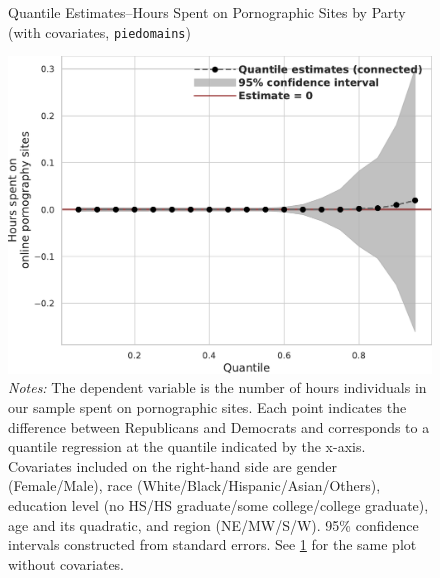 \documentclass[12pt, letterpaper]{article}
\begin{document}
\begin{figure}[ht]
	\centering
	\caption{Quantile Estimates--Hours Spent on Pornographic Sites by Party (with covariates, \texttt{piedomains})}
	\includegraphics[width=.55\linewidth]{figs/quantile_reg_covariates_duration_adult.pdf}
	\caption*{\footnotesize \emph{Notes:} 
		The dependent variable is the number of hours individuals in our sample spent on pornographic sites.
		Each point indicates the difference between Republicans and Democrats and corresponds to a quantile regression at the quantile indicated by the x-axis.
		Covariates included on the right-hand side are gender (Female/Male), race (White/Black/Hispanic/Asian/Others), education level (no HS/HS graduate/some college/college graduate), age and its quadratic, and region (NE/MW/S/W).
		95\% confidence intervals constructed from standard errors.
		See \cref{fig:piedomains_quantile_regression_duration_covariates} for the same plot without covariates.
	}
	\label{fig:piedomains_quantile_regression_duration_covariates}
\end{figure}



\FloatBarrier
\clearpage
\end{document}
